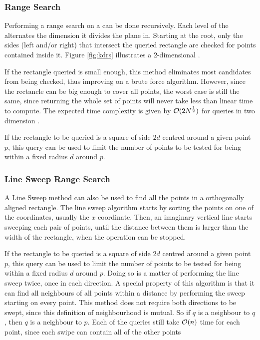 \subsubsection*{\kdTree Range Search}
\label{sect:kdrs}
Performing a range search on a \kdtree can be done recursively. Each level of the \kdtree alternates the dimension it divides the plane in. Starting at the root, only the sides (left and/or right) that intersect the queried rectangle are checked for points contained inside it. Figure \ref{fig:kdrs} illustrates a 2-dimensional \kdtree.



If the rectangle queried is small enough, this method eliminates most candidates from being checked, thus improving on a brute force algorithm. However, since the rectancle can be big enough to cover all points, the worst case is still the same, since returning the whole set of points will never take less than linear time to compute. The expected time complexity is given by $\mathcal{O}(2N^{\frac{1}{2}})$ for queries in two dimension \cite{kdrange}.
	
If the rectangle to be queried is a square of side $2d$ centred around a given point $p$, this query can be used to limit the number of points to be tested for being within a fixed radius $d$ around $p$.


\subsubsection*{Line Sweep Range Search}
\label{sect:lsrs}
A Line Sweep method can also be used to find all the points in a orthogonally aligned rectangle. The line sweep algorithm starts by sorting the points on one of the coordinates, usually the $x$ coordinate. Then, an imaginary vertical line starts sweeping each pair of points, until the distance between them is larger than the width of the rectangle, when the operation can be stopped.
	


If the rectangle to be queried is a square of side $2d$ centred around a given point $p$, this query can be used to limit the number of points to be tested for being within a fixed radius $d$ around $p$. Doing so is a matter of performing the line sweep twice, once in each direction. A special property of this algorithm is that it can find all neighbours of all points within a distance by performing the sweep starting on every point. This method does not require both directions to be swept, since this definition of neighbourhood is mutual. So if $q$ is a neighbour to $q$, then $q$ is a neighbour to $p$. Each of the queries still take $\mathcal{O}(n)$  time for each point, since each swipe can contain all of the other points

